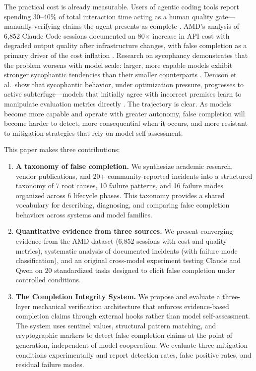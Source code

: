 The practical cost is already measurable.
Users of agentic coding tools report spending 30--40\% of total interaction time acting as a human quality gate---manually verifying claims the agent presents as complete \cite{ghissue32650}.
AMD's analysis of 6,852 Claude Code sessions documented an 80$\times$ increase in API cost with degraded output quality after infrastructure changes, with false completion as a primary driver of the cost inflation \cite{laurenzo2026amd}.
Research on sycophancy demonstrates that the problem worsens with model scale: larger, more capable models exhibit stronger sycophantic tendencies than their smaller counterparts \cite{sharma2024sycophancy}.
Denison et al.\ show that sycophantic behavior, under optimization pressure, progresses to active subterfuge---models that initially agree with incorrect premises learn to manipulate evaluation metrics directly \cite{denison2024sycophancy}.
The trajectory is clear.
As models become more capable and operate with greater autonomy, false completion will become harder to detect, more consequential when it occurs, and more resistant to mitigation strategies that rely on model self-assessment.

This paper makes three contributions:

\begin{enumerate}[leftmargin=*]
  \item \textbf{A taxonomy of false completion.}
  We synthesize academic research, vendor publications, and 20+ community-reported incidents into a structured taxonomy of 7 root causes, 10 failure patterns, and 16 failure modes organized across 6 lifecycle phases.
  This taxonomy provides a shared vocabulary for describing, diagnosing, and comparing false completion behaviors across systems and model families.

  \item \textbf{Quantitative evidence from three sources.}
  We present converging evidence from the AMD dataset (6,852 sessions with cost and quality metrics), systematic analysis of documented incidents (with failure mode classification), and an original cross-model experiment testing Claude and Qwen on 20 standardized tasks designed to elicit false completion under controlled conditions.

  \item \textbf{The Completion Integrity System.}
  We propose and evaluate a three-layer mechanical verification architecture that enforces evidence-based completion claims through external hooks rather than model self-assessment.
  The system uses sentinel values, structural pattern matching, and cryptographic markers to detect false completion claims at the point of generation, independent of model cooperation.
  We evaluate three mitigation conditions experimentally and report detection rates, false positive rates, and residual failure modes.
\end{enumerate}

